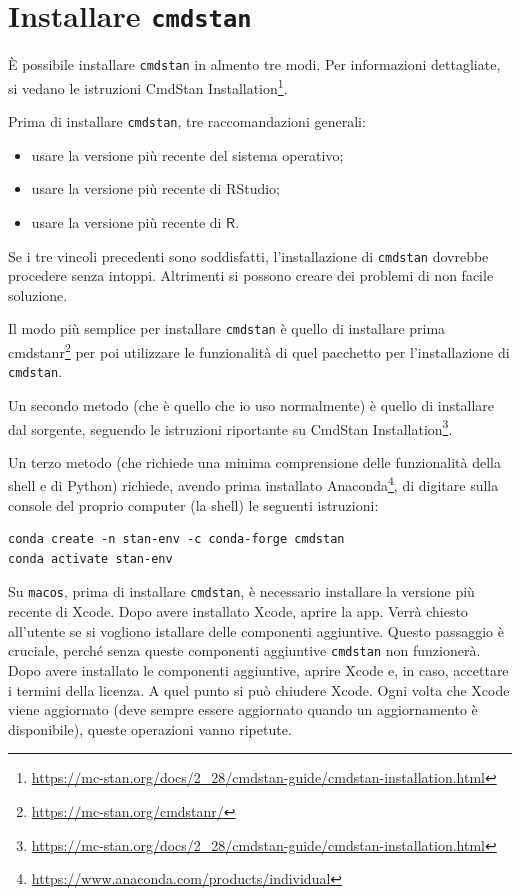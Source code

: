 \documentclass[
  11pt,
]{krantz}
\providecommand{\tightlist}{%
  \setlength{\itemsep}{0pt}\setlength{\parskip}{0pt}}
\renewcommand{\href}[2]{#2\footnote{\url{#1}}}
\newcommand{\R}{\textsf{R}} %
\theoremstyle{definition}
\theoremstyle{definition}
\theoremstyle{definition}
\theoremstyle{definition}
\theoremstyle{remark}
\begin{document}
\hypertarget{installare-cmdstan}{%
\section{\texorpdfstring{Installare \texttt{cmdstan}}{Installare cmdstan}}\label{installare-cmdstan}}

È possibile installare \texttt{cmdstan} in almento tre modi. Per informazioni dettagliate, si vedano le istruzioni \href{https://mc-stan.org/docs/2_28/cmdstan-guide/cmdstan-installation.html}{CmdStan Installation}.

Prima di installare \texttt{cmdstan}, tre raccomandazioni generali:

\begin{itemize}
\tightlist
\item
  usare la versione più recente del sistema operativo;
\item
  usare la versione più recente di RStudio;
\item
  usare la versione più recente di \(\R\).
\end{itemize}

Se i tre vincoli precedenti sono soddisfatti, l'installazione di \texttt{cmdstan} dovrebbe procedere senza intoppi. Altrimenti si possono creare dei problemi di non facile soluzione.

Il modo più semplice per installare \texttt{cmdstan} è quello di installare prima \href{https://mc-stan.org/cmdstanr/}{cmdstanr} per poi utilizzare le funzionalità di quel pacchetto per l'installazione di \texttt{cmdstan}.

Un secondo metodo (che è quello che io uso normalmente) è quello di installare dal sorgente, seguendo le istruzioni riportante su \href{https://mc-stan.org/docs/2_28/cmdstan-guide/cmdstan-installation.html}{CmdStan Installation}.

Un terzo metodo (che richiede una minima comprensione delle funzionalità della shell e di Python) richiede, avendo prima installato \href{https://www.anaconda.com/products/individual}{Anaconda}, di digitare sulla console del proprio computer (la shell) le seguenti istruzioni:

\begin{verbatim}
conda create -n stan-env -c conda-forge cmdstan
conda activate stan-env
\end{verbatim}

Su \texttt{macos}, prima di installare \texttt{cmdstan}, è necessario installare la versione più recente di Xcode. Dopo avere installato Xcode, aprire la app. Verrà chiesto all'utente se si vogliono istallare delle componenti aggiuntive. Questo passaggio è cruciale, perché senza queste componenti aggiuntive \texttt{cmdstan} non funzionerà. Dopo avere installato le componenti aggiuntive, aprire Xcode e, in caso, accettare i termini della licenza. A quel punto si può chiudere Xcode. Ogni volta che Xcode viene aggiornato (deve sempre essere aggiornato quando un aggiornamento è disponibile), queste operazioni vanno ripetute.
\end{document}
